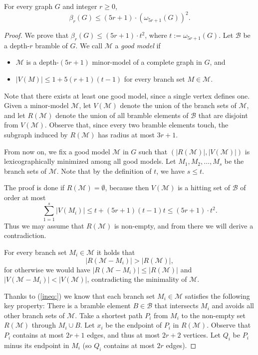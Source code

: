 \documentclass[10pt,a4paper]{amsart}
\newcommand{\bn}{\beta}
\newcommand{\dep}{depth}
\renewcommand{\geq}{\geqslant}
\renewcommand{\leq}{\leqslant}
\renewcommand{\le}{\leqslant}
\begin{document}
\begin{thm}
For every graph $G$ and integer $r\geq0$, 
 $$  \bn_r(G) \leq (5r+1)\cdot (\omega_{5r+1}(G))^2.$$
\end{thm}

\begin{proof}
 We prove that $\bn_r(G) \leq (5r+1) \cdot t^2$, where $t:=\omega_{5r+1}(G)$.
Let $\mathcal{B}$ be a \dep-$r$ bramble of $G$.
We call $\mathcal{M}$ a \emph{good model} if
\begin{itemize}
\item $\mathcal{M}$ is a depth-$(5r+1)$ minor-model of a complete graph in $G$, and
\item $|V(M)|\leq 1+5(r+1)(t-1)$ for every branch set $M\in \mathcal{M}$.
\end{itemize}

Note that there exists at least one good model, since a single vertex defines one. Given a minor-model $\mathcal{M}$, let $V(\mathcal{M})$ denote the union of the branch sets of $\mathcal{M}$, and let $R(\mathcal{M})$ denote the union of all bramble elements of $\mathcal{B}$ that are disjoint from $V(\mathcal{M})$. Observe that, since every two bramble elements touch, the subgraph induced by $R(\mathcal{M})$ has radius at most $3r+1$.

\smallskip

From now on, we fix a good model $\mathcal {M}$ in $G$ such that
$(|R(\mathcal{M})|, |V(\mathcal{M})|)$ is lexicographically minimized among all good models. Let $M_1,M_2,\ldots, M_s$ be the branch sets of $\mathcal{M}$. Note that by the definition of $t$, we have $s\leq t$.

\smallskip

The proof is done if $R(\mathcal{M})= \emptyset$, because then $V(\mathcal{M})$ is a hitting set of $\mathcal{B}$ of order at most \[\sum_{1=1}^{s} |V(M_i)| \leq t+ (5r+1)(t-1)t \leq (5r+1)\cdot t^2.\]
Thus we may assume that $R(\mathcal{M})$ is non-empty, and from there we will derive a contradiction.
\smallskip


For every branch set $M_i\in \mathcal{M}$ it holds that
 \begin{equation}\label{ineq:}
 |R(\mathcal{M}-M_i)| > |R(\mathcal{M})|, 
 \end{equation}
  for otherwise we would have $|R(\mathcal{M}-M_i)| \le|R(\mathcal{M})|$ and $|V(\mathcal{M}-M_i)| <|V(\mathcal{M})|$, contradicting the minimality of $\mathcal{M}$. 



Thanks to (\ref{ineq:}) we know that each branch set $M_i\in \mathcal{M}$ satisfies the following key
property: There is a bramble element $B\in\mathcal{B}$ that intersects $M_i$ and avoids all other branch sets of $\mathcal{M}$. Take a shortest path $P_i$ from $M_i$ to the non-empty set $R(\mathcal{M})$ through $M_i \cup B$. Let $x_i$ be the endpoint of $P_i$ in $R(\mathcal{M})$. Observe that $P_i$ contains at most $2r+1$ edges, and thus at most $2r+2$ vertices. Let $Q_i$ be $P_i$ minus its endpoint in $M_i$ (so $Q_i$ contains at most $2r$ edges).


\end{proof}
\end{document}
